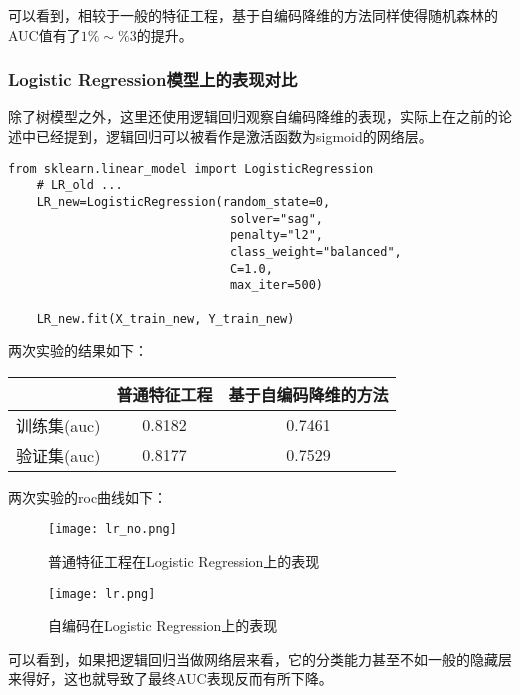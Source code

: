 可以看到，相较于一般的特征工程，基于自编码降维的方法同样使得随机森林的AUC值有了$1\%\sim\%3$的提升。\\

\subsubsection{Logistic Regression模型上的表现对比}
除了树模型之外，这里还使用逻辑回归观察自编码降维的表现，实际上在之前的论述中已经提到，逻辑回归可以被看作是激活函数为sigmoid的网络层。

\begin{lstlisting}[frame=shadowbox]
    from sklearn.linear_model import LogisticRegression
    # LR_old ...
    LR_new=LogisticRegression(random_state=0,
                               solver="sag",
                               penalty="l2",
                               class_weight="balanced",
                               C=1.0,
                               max_iter=500)
    
    LR_new.fit(X_train_new, Y_train_new)
\end{lstlisting}

两次实验的结果如下：\\

\begin{center}
    \begin{tabular}{ccc}
        \hline
                    & 普通特征工程 & 基于自编码降维的方法 \\
        \hline
        训练集(auc) & 0.8182       & 0.7461               \\
        \hline
        验证集(auc) & 0.8177       & 0.7529               \\
        \hline
    \end{tabular}
\end{center}

两次实验的roc曲线如下：
\begin{figure}[H]
    \centering
    \texttt{[image: lr\_no.png]}
    \caption{普通特征工程在Logistic Regression上的表现}
    \label{fig:rf_no}
\end{figure}

\begin{figure}[H]
    \centering
    \texttt{[image: lr.png]}
    \caption{自编码在Logistic Regression上的表现}
    \label{fig:rf}
\end{figure}

可以看到，如果把逻辑回归当做网络层来看，它的分类能力甚至不如一般的隐藏层来得好，这也就导致了最终AUC表现反而有所下降。

